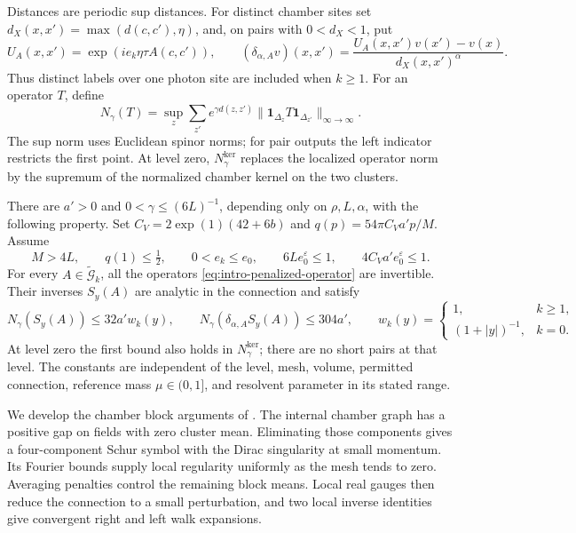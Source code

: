 Distances are periodic sup distances. For distinct chamber sites set
\(d_X(x,x')=\max(d(c,c'),\eta)\), and, on pairs with \(0<d_X<1\), put
\[
 U_A(x,x')=\exp(ie_k\eta\tau A(c,c')),\qquad
 (\delta_{\alpha,A}v)(x,x')
 =\frac{U_A(x,x')v(x')-v(x)}
        {d_X(x,x')^\alpha}.
\]
Thus distinct labels over one photon site are included when \(k\ge1\).
For an operator \(T\), define
\[
 N_\gamma(T)=\sup_z\sum_{z'}e^{\gamma d(z,z')}
       \|\mathbf1_{\Delta_z}T\mathbf1_{\Delta_{z'}}\|_{\infty\to\infty}.
\]
The sup norm uses Euclidean spinor norms; for pair outputs the left
indicator restricts the first point. At level zero,
\(N_\gamma^{\mathrm{ker}}\) replaces the localized operator norm by
the supremum of the normalized chamber kernel on the two clusters.

\begin{theorem}\label{thm:chamber-locality}
There are \(a'>0\) and \(0<\gamma\le(6L)^{-1}\), depending only on
\(\rho,L,\alpha\), with the following property. Set
\(C_V=2\exp(1)(42+6b)\) and
\(q(p)=54\pi C_Va'p/M\). Assume
\begin{equation}\label{eq:main-locality-conditions}
 M>4L,\qquad q(1)\le\tfrac12,\qquad
 0<e_k\le e_0,\qquad
 6Le_0^\varepsilon\le1,\qquad 4C_Va'e_0^\varepsilon\le1.
\end{equation}
For every \(A\in\widetilde{\mathcal G}_k\), all the operators
\eqref{eq:intro-penalized-operator} are invertible. Their inverses
\(S_y(A)\) are analytic in the connection and satisfy
\[
 N_\gamma(S_y(A))\le32a'w_k(y),\qquad
 N_\gamma(\delta_{\alpha,A}S_y(A))\le304a',\qquad
 w_k(y)=
 \begin{cases}1,&k\ge1,\\(1+|y|)^{-1},&k=0.\end{cases}
\]
At level zero the first bound also holds in
\(N_\gamma^{\mathrm{ker}}\); there are no short pairs at that level.
The constants are independent of the level, mesh, volume,
permitted connection, reference mass \(\mu\in(0,1]\), and resolvent
parameter in its stated range.
\end{theorem}

We develop the chamber block arguments of
\cite[Sections~9 and~11]{QED3Manuscript}. The internal chamber graph
has a positive gap on fields with zero cluster mean. Eliminating those
components gives a four-component Schur symbol with the Dirac
singularity at small momentum. Its Fourier bounds supply local
regularity uniformly as the mesh tends to zero. Averaging penalties
control the remaining block means. Local real gauges then reduce the
connection to a small perturbation, and two local inverse identities
give convergent right and left walk expansions.


